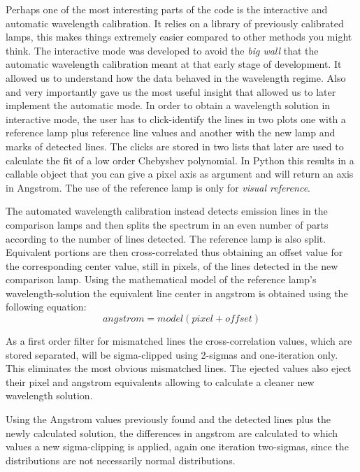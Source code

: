 \documentclass[11pt,twoside]{article}
\begin{document}
Perhaps one of the most interesting parts of the code is the interactive and
automatic wavelength calibration. It relies on a library of previously calibrated
lamps, this makes things extremely easier compared to other methods you might think.
The interactive mode was developed to avoid the \emph{big wall} that the automatic
wavelength calibration meant at that early stage of development. It allowed us to 
understand how the data behaved in the wavelength regime. Also and very importantly
gave us the most useful insight that allowed us to later implement the automatic mode.
In order to obtain a wavelength solution in interactive mode, the user has to click-identify 
the lines in two plots one with a reference lamp plus reference line values and
another with the new lamp and marks of detected lines. The clicks are stored in
two lists that later are used to calculate the fit of a low order Chebyshev polynomial.
In Python this results in a callable object that you can give a pixel axis as argument 
and will return an axis in Angstrom. The use of the reference lamp is only for
\emph{visual reference}.

The automated wavelength calibration instead detects emission lines in the comparison lamps
and then splits the spectrum in an even number of parts according to the number of lines detected.
The reference lamp is also split. Equivalent portions are then cross-correlated 
thus obtaining an offset value for the corresponding center value, still in pixels, 
of the lines detected in the new comparison lamp. Using the mathematical model of the reference
lamp's wavelength-solution  the equivalent line center in angstrom is obtained 
using the following equation:
\begin{equation}
 angstrom = model(pixel + offset)
\end{equation}

As a first order filter for mismatched lines the cross-correlation values, which
are stored separated, will be sigma-clipped using 2-sigmas and one-iteration only.
This eliminates the most obvious mismatched lines. The ejected values also eject
their pixel and angstrom equivalents allowing to calculate a cleaner new wavelength solution.


Using the Angstrom values previously found and the detected lines
plus the newly calculated solution, the differences in angstrom are
calculated to which values a new sigma-clipping is applied, again
one iteration two-sigmas, since the distributions are not
necessarily normal distributions.
\end{document}
